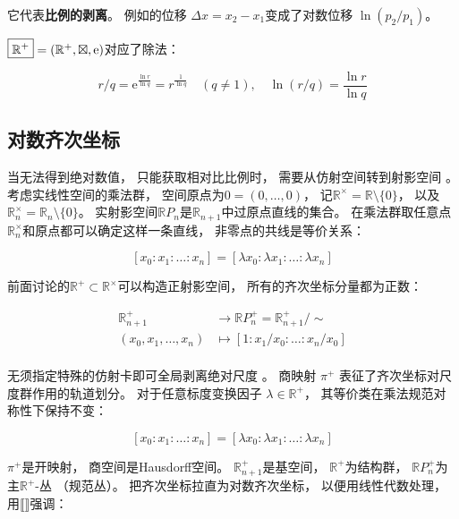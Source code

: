 ﻿\documentclass[10pt,a4paper]{article}
\numberwithin{equation}{section}
\newcommand{\sqtimes}{\mathbin{\boxtimes}}
\newcommand{\sqdiv}{\mathbin{\boxed{/}}}
\begin{document}
它代表\textbf{比例的剥离}。
例如的位移 $\Delta x = x_2 - x_1$变成了对数位移 $\ln(p_2 / p_1)$。

$\boxed{\mathbb R^+} = (\mathbb R^+,\sqtimes,\text e)$对应了除法：

\begin{equation*}
r \sqdiv q = \text{e}^{\frac{\ln r}{\ln q}} = r^{\frac{1}{\ln q}} \quad (q \neq 1),\quad
\ln(r \sqdiv q) = \frac{\ln r}{\ln q}
\end{equation*}


\subsection{对数齐次坐标}

当无法得到绝对数值，
只能获取相对比比例时，
需要从仿射空间转到射影空间
\cite{Hartshorne1977}。
考虑实线性空间的乘法群，
空间原点为$0=(0,\ldots,0)$，
记$\mathbb R^\times = \mathbb R \setminus \{0\}$，
以及$\mathbb R_n^\times = \mathbb R_n \setminus \{0\}$。
实射影空间$\mathbb R P_n$是$\mathbb R_{n+1}$中过原点直线的集合。
在乘法群取任意点$\mathbb R_n^\times$和原点都可以确定这样一条直线，
非零点的共线是等价关系：

$$
[x_0 : x_1 : \ldots : x_n] = [\lambda x_0 : \lambda x_1 : \ldots : \lambda x_n]
$$

前面讨论的$\mathbb R^+ \subset \mathbb R^\times$可以构造正射影空间，
所有的齐次坐标分量都为正数：

\begin{equation}
\begin{aligned}
\mathbb R_{n+1}^+ &\to \mathbb R P^+_n = \mathbb R_{n+1}^+/\sim \\
(x_0,x_1,\ldots,x_n) &\mapsto [1 : x_1/x_0 : \ldots : x_n/x_0] \\
\end{aligned}
\label{eq:proj-space-positive}
\end{equation}

无须指定特殊的仿射卡即可全局剥离绝对尺度 \cite{Hartshorne1977}。
商映射 $\pi^+$ 表征了齐次坐标对尺度群作用的轨道划分。
对于任意标度变换因子 $\lambda \in \mathbb{R}^+$，
其等价类在乘法规范对称性下保持不变：

$$
[x_0 : x_1 : \ldots : x_n] = [\lambda x_0 : \lambda x_1 : \ldots : \lambda x_n]
$$

$\pi^+$是开映射，
商空间是Hausdorff空间。
$\mathbb R_{n+1}^+$是基空间，
$\mathbb R^+$为结构群，
$\mathbb R P_n^+$为主$\mathbb R^+$-丛 （规范丛）。
把齐次坐标拉直为对数齐次坐标，
以便用线性代数处理，
用$\llbracket\rrbracket$强调：
\end{document}

